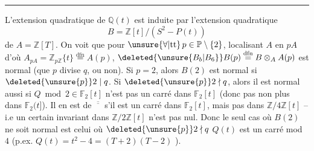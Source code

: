 \medskip\hrule\medskip

L'extension quadratique de $\mathbb Q(t)$ est induite par l'extension quadratique
\[
B=\mathbb Z[t]/(S^2-P(t))
\]
de $A=\mathbb Z[T]$. On voit que pour $\unsure{\forall|\mathrm{tt}}\,p\in\mathbb P\setminus\{2\}$, localisant $A$ en $pA$ d'où $A_{pA}=\mathbb Z_{p\mathbb Z}\{t\}\overset{\mathrm{dfn}}=A(p)$, $\deleted{\unsure{B_b|B_6}}B(p)\overset{\mathrm{dfn}}=B\otimes_A A(p)$ est normal (que $p$ divise $q$, ou non). Si $p=2$, alors $B(2)$ est normal si $\deleted{\unsure{p}}2\mid q$. Si $\deleted{\unsure{p}}2\nmid q$, alors il est normal aussi si $Q\bmod 2\in\mathbb F_2[t]$ n'est pas un carré dans $\mathbb F_2[t]$ (donc pas non plus dans $\mathbb F_2(t]$).  Il en est de $\overline{\overline{\phantom{m}}}$ s'il est un carré dans $\mathbb F_2[t]$, mais pas dans $\mathbb Z/4\mathbb Z[t]$ -- i.e un certain invariant dans $\mathbb Z/2\mathbb Z[t]$ n'est pas nul. Donc le seul cas où $B(2)$ ne soit normal est celui où $\deleted{\unsure{p}}2\nmid q$  $Q(t)$ est un carré mod $4$ (p.ex. $Q(t)=t^2-4=(T+2)(T-2)$ ).

